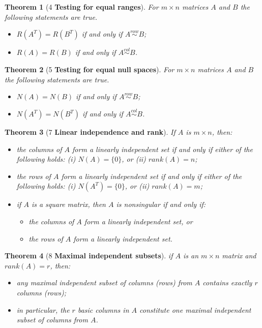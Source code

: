 \documentclass[10.5pt]{article}
\newtheorem{theo}{Theorem}
\begin{document}
\begin{theo}[4 \textbf{Testing for equal ranges}]
For $m \times n$ matrices $A$ and $B$ the following statements are true.
\begin{itemize}
\item $R(A^T) = R(B^T)$ if and only if $A \overset{row}{\sim} B$;
\item $R(A) = R(B)$ if and only if $A \overset{col}{\sim} B$.
\end{itemize}
\end{theo}
\begin{theo}[5 \textbf{Testing for equal null spaces}]
For $m \times n$ matrices $A$ and $B$ the following statements are true.
\begin{itemize}
\item $N(A) = N(B)$ if and only if $A \overset{row}{\sim} B$;
\item $N(A^T) = N(B^T)$ if and only if $A \overset{col}{\sim} B$.
\end{itemize}
\end{theo}
\begin{theo}[7 \textbf{Linear independence and rank}]
If $A$ is $m \times n$, then:
\begin{itemize}
\item the columns of $A$ form a linearly independent set if and only if either of the following holds: (i) $N(A) = \{0\}$, or (ii) $rank(A) = n$;
\item the rows of $A$ form a linearly independent set if and only if either of the following holds: (i) $N(A^T) = \{0\}$, or (ii) $rank(A) = m$;
\item if $A$ is a square matrix, then $A$ is nonsingular if and only if:
\begin{itemize}
\item the columns of $A$ form a linearly independent set, or
\item the rows of $A$ form a linearly independent set.
\end{itemize}
\end{itemize}
\end{theo}
\begin{theo}[8 \textbf{Maximal independent subsets}]
if $A$ is an $m\times n$ matrix and $rank(A) = r$, then:
\begin{itemize}
\item any maximal independent subset of columns (rows) from $A$ contains exactly $r$ columns (rows);
\item in particular, the $r$ basic columns in $A$ constitute one maximal independent subset of columns from $A$.
\end{itemize}
\end{theo}
\end{document}
